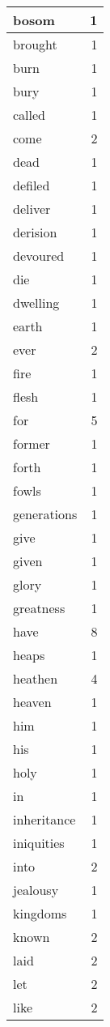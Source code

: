 \begin{center}
\begin{longtable}{l|r}
bosom & 1 \\ \hline
brought & 1 \\ \hline
burn & 1 \\ \hline
bury & 1 \\ \hline
called & 1 \\ \hline
come & 2 \\ \hline
dead & 1 \\ \hline
defiled & 1 \\ \hline
deliver & 1 \\ \hline
derision & 1 \\ \hline
devoured & 1 \\ \hline
die & 1 \\ \hline
dwelling & 1 \\ \hline
earth & 1 \\ \hline
ever & 2 \\ \hline
fire & 1 \\ \hline
flesh & 1 \\ \hline
for & 5 \\ \hline
former & 1 \\ \hline
forth & 1 \\ \hline
fowls & 1 \\ \hline
generations & 1 \\ \hline
give & 1 \\ \hline
given & 1 \\ \hline
glory & 1 \\ \hline
greatness & 1 \\ \hline
have & 8 \\ \hline
heaps & 1 \\ \hline
heathen & 4 \\ \hline
heaven & 1 \\ \hline
him & 1 \\ \hline
his & 1 \\ \hline
holy & 1 \\ \hline
in & 1 \\ \hline
inheritance & 1 \\ \hline
iniquities & 1 \\ \hline
into & 2 \\ \hline
jealousy & 1 \\ \hline
kingdoms & 1 \\ \hline
known & 2 \\ \hline
laid & 2 \\ \hline
let & 2 \\ \hline
like & 2 \\ \hline

\end{longtable}
\end{center}
